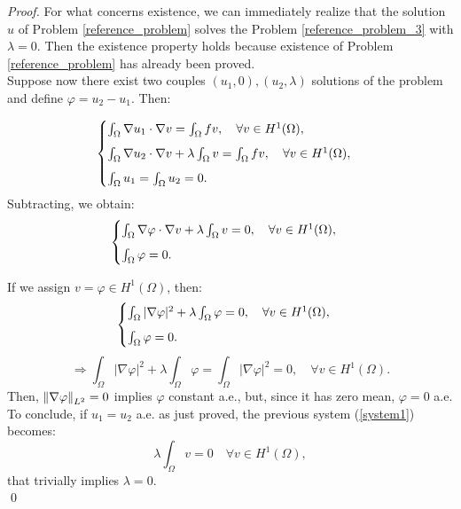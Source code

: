 \documentclass[a4paper,11pt]{article}
\begin{document}
\begin{proof}
	For what concerns existence, we can immediately realize that the solution $u$ of Problem \ref{reference_problem} solves the Problem \ref{reference_problem_3} with $\lambda=0$. Then the existence property holds because existence of Problem \ref{reference_problem} has already been proved. \\
	
	\noindent Suppose now there exist two couples $(u_1,0), (u_2,\lambda)$ solutions of the problem and define $\varphi=u_2-u_1$. Then:
	
	\begin{equation*}
	\begin{cases}
	\int_{\Omega}\nabla u_1 \cdot \nabla v = \int_{\Omega} fv, \quad \forall v \in H^1(\Omega),\vspace{2mm} \\
	\int_{\Omega}\nabla u_2 \cdot \nabla v + \lambda \int_\Omega v = \int_{\Omega} fv, \quad \forall v \in H^1(\Omega), \vspace{2mm}\\
	\int_{\Omega}u_1 = \int_{\Omega}u_2 = 0.
	\end{cases}
	\end{equation*}
		Subtracting, we obtain:
	\begin{equation}\label{system1}
	\begin{cases}
	\int_{\Omega}\nabla \varphi \cdot \nabla v + \lambda \int_\Omega v = 0, \quad \forall v \in H^1(\Omega),\vspace{2mm} \\
	\int_{\Omega}\varphi = 0.
	\end{cases}
	\end{equation}
	
	\noindent If we assign $v=\varphi \in H^1(\Omega)$, then:
	\begin{equation*}
	\begin{cases}
	\int_{\Omega}|\nabla \varphi|^2 + \lambda \int_\Omega \varphi = 0, \quad \forall v \in H^1(\Omega),\vspace{2mm} \\
	\int_{\Omega}\varphi = 0.
	\end{cases}
	\end{equation*}
	\begin{equation*}
	\Rightarrow \int_{\Omega}|\nabla \varphi|^2 + \lambda \int_\Omega \varphi = \int_{\Omega}|\nabla \varphi|^2 = 0, \quad \forall v \in H^1(\Omega).
	\end{equation*}
	Then, $\norm{\nabla \varphi}_{L^2} = 0 $ implies $\varphi$ constant a.e., but, since it has zero mean,  $\varphi = 0$ a.e.  \\
	To conclude, if $u_1=u_2$ a.e. as just proved, the previous system (\ref{system1}) becomes:
	\begin{equation*}
	\lambda \int_{\Omega}v = 0 \quad \forall v \in H^1(\Omega),
	\end{equation*}
	that trivially implies $\lambda=0$.	\\ \qed
\end{proof}
	
\end{document}
